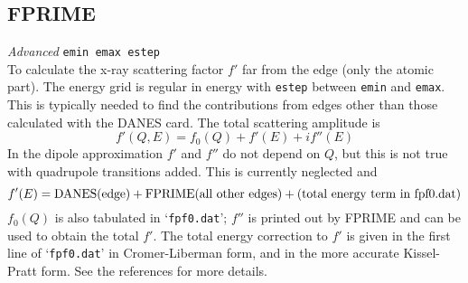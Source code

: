 \documentclass[11pt,oneside]{report} %
\newenvironment{Card}[4]%
      {\vspace{3ex}%
        \subsection{#1}
        \quad\textsl{#3}\newline
        \quad\texttt{#2}\newline%
        \label{card:#4}\\}
      {}
\newcommand{\file}[1]{`\texttt{#1}'}
\begin{document}
\begin{Card}{FPRIME}{emin emax estep}{Advanced}{fpr}
  To calculate the x-ray scattering factor $f'$ far from the edge
  (only the atomic part). The energy grid is regular in energy with \texttt{estep} 
  between \texttt{emin} and \texttt{emax}. This is typically needed to find 
  the contributions from edges other than those calculated with the DANES card. 
  The total scattering amplitude is $$f'(Q,E) = f_0(Q) + f'(E) +if''(E)$$
  In the dipole approximation $f'$ and $f''$ do not depend on $Q$, but
  this is not true with quadrupole transitions added. This is currently 
  neglected
  and $$f'(E)={\rm DANES(edge)+FPRIME(all\ other\ edges) + (total\ energy\ term\ in\ fpf0.dat)}$$
  $f_0(Q)$ is also tabulated in \file{fpf0.dat};
  $f''$ is printed out by FPRIME and can be used to obtain the total $f'$.
  The total energy correction to $f'$ is given in the first line of
  \file{fpf0.dat} in Cromer-Liberman form, and in the more accurate Kissel-Pratt 
  form. See the references for more details.
\end{Card}
\end{document}
